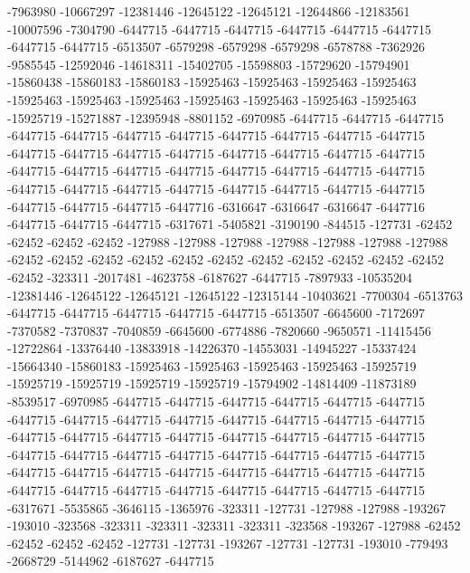 -7963980 -10667297 -12381446 -12645122 -12645121 -12644866 -12183561 -10007596 -7304790 -6447715 -6447715 -6447715 -6447715 -6447715 -6447715 -6447715 -6447715 -6513507 -6579298 -6579298 -6579298 -6578788 -7362926 -9585545 -12592046 -14618311 -15402705 -15598803 -15729620 -15794901 -15860438 -15860183 -15860183 -15925463 -15925463 -15925463 -15925463 -15925463 -15925463 -15925463 -15925463 -15925463 -15925463 -15925463 -15925719 -15271887 -12395948 -8801152 -6970985 -6447715 -6447715 -6447715 -6447715 -6447715 -6447715 -6447715 -6447715 -6447715 -6447715 -6447715 -6447715 -6447715 -6447715 -6447715 -6447715 -6447715 -6447715 -6447715 -6447715 -6447715 -6447715 -6447715 -6447715 -6447715 -6447715 -6447715 -6447715 -6447715 -6447715 -6447715 -6447715 -6447715 -6447715 -6447715 -6447715 -6447715 -6447715 -6447716 -6316647 -6316647 -6316647 -6447716 -6447715 -6447715 -6447715 -6317671 -5405821 -3190190 -844515 -127731 -62452 -62452 -62452 -62452 -127988 -127988 -127988 -127988 -127988 -127988 -127988 -62452 -62452 -62452 -62452 -62452 -62452 -62452 -62452 -62452 -62452 -62452 -62452 -323311 -2017481 -4623758 -6187627 -6447715
-7897933 -10535204 -12381446 -12645122 -12645121 -12645122 -12315144 -10403621 -7700304 -6513763 -6447715 -6447715 -6447715 -6447715 -6447715 -6513507 -6645600 -7172697 -7370582 -7370837 -7040859 -6645600 -6774886 -7820660 -9650571 -11415456 -12722864 -13376440 -13833918 -14226370 -14553031 -14945227 -15337424 -15664340 -15860183 -15925463 -15925463 -15925463 -15925463 -15925719 -15925719 -15925719 -15925719 -15925719 -15794902 -14814409 -11873189 -8539517 -6970985 -6447715 -6447715 -6447715 -6447715 -6447715 -6447715 -6447715 -6447715 -6447715 -6447715 -6447715 -6447715 -6447715 -6447715 -6447715 -6447715 -6447715 -6447715 -6447715 -6447715 -6447715 -6447715 -6447715 -6447715 -6447715 -6447715 -6447715 -6447715 -6447715 -6447715 -6447715 -6447715 -6447715 -6447715 -6447715 -6447715 -6447715 -6447715 -6447715 -6447715 -6447715 -6447715 -6447715 -6447715 -6447715 -6447715 -6317671 -5535865 -3646115 -1365976 -323311 -127731 -127988 -127988 -193267 -193010 -323568 -323311 -323311 -323311 -323311 -323568 -193267 -127988 -62452 -62452 -62452 -62452 -127731 -127731 -193267 -127731 -127731 -193010 -779493 -2668729 -5144962 -6187627 -6447715
